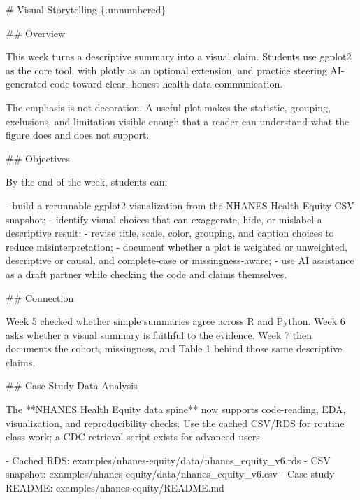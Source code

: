 \documentclass[
  letterpaper,
  DIV=11,
  numbers=noendperiod,
  oneside]{scrreprt}
\newenvironment{Shaded}{\begin{snugshade}}{\end{snugshade}}
\newcommand{\FunctionTok}[1]{\textcolor[rgb]{0.28,0.35,0.67}{#1}}
\newcommand{\InformationTok}[1]{\textcolor[rgb]{0.37,0.37,0.37}{#1}}
\newcommand{\NormalTok}[1]{\textcolor[rgb]{0.00,0.23,0.31}{#1}}
\newcommand{\SpecialStringTok}[1]{\textcolor[rgb]{0.13,0.47,0.30}{#1}}
\begin{document}
\begin{Shaded}
\begin{Highlighting}[numbers=left,,]
\FunctionTok{\# Visual Storytelling \{.unnumbered\}}


\FunctionTok{\#\# Overview}

\NormalTok{This week turns a descriptive summary into a visual claim. Students use }\InformationTok{\textasciigrave{}ggplot2\textasciigrave{}}\NormalTok{ as the core tool, with }\InformationTok{\textasciigrave{}plotly\textasciigrave{}}\NormalTok{ as an optional extension, and practice steering AI{-}generated code toward clear, honest health{-}data communication.}

\NormalTok{The emphasis is not decoration. A useful plot makes the statistic, grouping, exclusions, and limitation visible enough that a reader can understand what the figure does and does not support.}

\FunctionTok{\#\# Objectives}

\NormalTok{By the end of the week, students can:}

\SpecialStringTok{{-} }\NormalTok{build a rerunnable }\InformationTok{\textasciigrave{}ggplot2\textasciigrave{}}\NormalTok{ visualization from the NHANES Health Equity CSV snapshot;}
\SpecialStringTok{{-} }\NormalTok{identify visual choices that can exaggerate, hide, or mislabel a descriptive result;}
\SpecialStringTok{{-} }\NormalTok{revise title, scale, color, grouping, and caption choices to reduce misinterpretation;}
\SpecialStringTok{{-} }\NormalTok{document whether a plot is weighted or unweighted, descriptive or causal, and complete{-}case or missingness{-}aware;}
\SpecialStringTok{{-} }\NormalTok{use AI assistance as a draft partner while checking the code and claims themselves.}

\FunctionTok{\#\# Connection}

\NormalTok{Week 5 checked whether simple summaries agree across R and Python. Week 6 asks whether a visual summary is faithful to the evidence. Week 7 then documents the cohort, missingness, and Table 1 behind those same descriptive claims.}

\FunctionTok{\#\# Case Study Data Analysis}

\NormalTok{The **NHANES Health Equity data spine** now supports code{-}reading, EDA, visualization, and reproducibility checks. Use the cached CSV/RDS for routine class work; a CDC retrieval script exists for advanced users.}

\SpecialStringTok{{-} }\NormalTok{Cached RDS: }\InformationTok{\textasciigrave{}examples/nhanes{-}equity/data/nhanes\_equity\_v6.rds\textasciigrave{}}
\SpecialStringTok{{-} }\NormalTok{CSV snapshot: }\InformationTok{\textasciigrave{}examples/nhanes{-}equity/data/nhanes\_equity\_v6.csv\textasciigrave{}}
\SpecialStringTok{{-} }\NormalTok{Case{-}study README: }\InformationTok{\textasciigrave{}examples/nhanes{-}equity/README.md\textasciigrave{}}


\end{Highlighting}
\end{Shaded}
\end{document}
